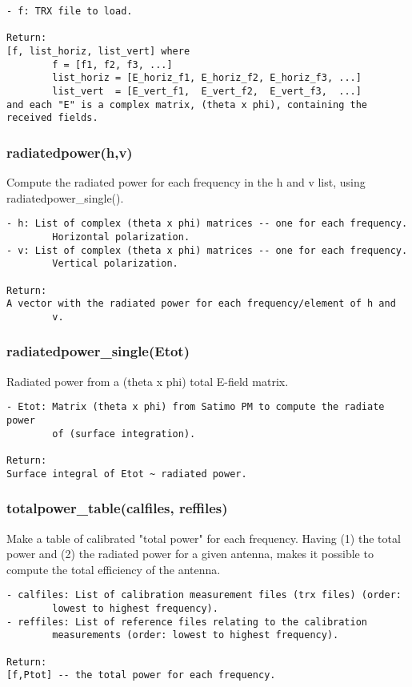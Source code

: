 \begin{verbatim}
- f: TRX file to load.

Return:
[f, list_horiz, list_vert] where
        f = [f1, f2, f3, ...]
        list_horiz = [E_horiz_f1, E_horiz_f2, E_horiz_f3, ...]
        list_vert  = [E_vert_f1,  E_vert_f2,  E_vert_f3,  ...]
and each "E" is a complex matrix, (theta x phi), containing the received fields.
\end{verbatim}

\subsubsection{radiatedpower(h,v)}
Compute the radiated power for each frequency in the h and v list, using
radiatedpower\_single().

\begin{verbatim}
- h: List of complex (theta x phi) matrices -- one for each frequency.
        Horizontal polarization.
- v: List of complex (theta x phi) matrices -- one for each frequency.
        Vertical polarization.

Return:
A vector with the radiated power for each frequency/element of h and
        v.
\end{verbatim}

\subsubsection{radiatedpower\_single(Etot)}
Radiated power from a (theta x phi) total E-field matrix.

\begin{verbatim}
- Etot: Matrix (theta x phi) from Satimo PM to compute the radiate power
        of (surface integration).

Return:
Surface integral of Etot ~ radiated power.
\end{verbatim}

\subsubsection{totalpower\_table(calfiles, reffiles)}
Make a table of calibrated "total power" for each frequency.
Having (1) the total power and (2) the radiated power for a given antenna,
makes it possible to compute the total efficiency of the antenna.

\begin{verbatim}
- calfiles: List of calibration measurement files (trx files) (order:
        lowest to highest frequency).
- reffiles: List of reference files relating to the calibration
        measurements (order: lowest to highest frequency).

Return:
[f,Ptot] -- the total power for each frequency.
\end{verbatim}

